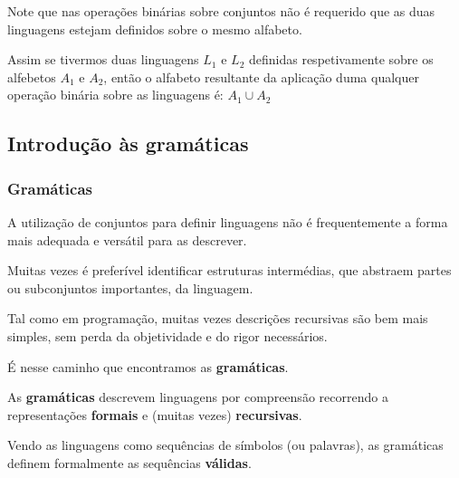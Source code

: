 \documentclass{article}
\begin{document}
\begin{flushleft}
  \item Note que nas operações binárias sobre conjuntos não é
  requerido que as duas linguagens estejam definidos sobre
  o mesmo alfabeto.
  \item Assim se tivermos duas linguagens $L_1$ e $L_2$ definidas
  respetivamente sobre os alfebetos $A_1$ e $A_2$, então o
  alfabeto resultante da aplicação duma qualquer operação
  binária sobre as linguagens é: $A_1 \cup A_2$
\end{flushleft}

\pagebreak

\subsection{Introdução às gramáticas}

\subsubsection{Gramáticas}

\begin{flushleft}
  \item A utilização de conjuntos para definir linguagens não é
  frequentemente a forma mais adequada e versátil para as
  descrever.
  \item Muitas vezes é preferível identificar estruturas
  intermédias, que abstraem partes ou subconjuntos
  importantes, da linguagem.
  \item Tal como em programação, muitas vezes descrições
  recursivas são bem mais simples, sem perda da
  objetividade e do rigor necessários.
  \item É nesse caminho que encontramos as \textbf{gramáticas}.
  \item As \textbf{gramáticas} descrevem linguagens por compreensão
  recorrendo a representações \textbf{formais} e (muitas vezes)
  \textbf{recursivas}.
  \item Vendo as linguagens como sequências de símbolos (ou
  palavras), as gramáticas definem formalmente as
  sequências \textbf{válidas}.
\end{flushleft}
\end{document}
